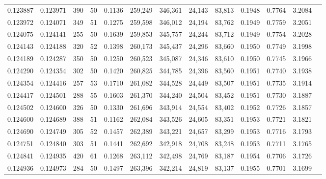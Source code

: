 \begin{tabular}{rrrrrrrrrrrrr}
0.123887 & 0.123971 &   390 &  50 &                                     0.1136 & 259,249 & 346,361 &  24,143 &  83,813 & 0.1948 & 0.7764 & 3.2084 \\
0.123972 & 0.124071 &   349 &  51 &                                     0.1275 & 259,598 & 346,012 &  24,194 &  83,762 & 0.1949 & 0.7759 & 3.2051 \\
0.124075 & 0.124141 &   255 &  50 &                                     0.1639 & 259,853 & 345,757 &  24,244 &  83,712 & 0.1949 & 0.7754 & 3.2028 \\
0.124143 & 0.124188 &   320 &  52 &                                     0.1398 & 260,173 & 345,437 &  24,296 &  83,660 & 0.1950 & 0.7749 & 3.1998 \\
0.124189 & 0.124287 &   350 &  50 &                                     0.1250 & 260,523 & 345,087 &  24,346 &  83,610 & 0.1950 & 0.7745 & 3.1966 \\
0.124290 & 0.124354 &   302 &  50 &                                     0.1420 & 260,825 & 344,785 &  24,396 &  83,560 & 0.1951 & 0.7740 & 3.1938 \\
0.124354 & 0.124416 &   257 &  53 &                                     0.1710 & 261,082 & 344,528 &  24,449 &  83,507 & 0.1951 & 0.7735 & 3.1914 \\
0.124417 & 0.124501 &   288 &  55 &                                     0.1603 & 261,370 & 344,240 &  24,504 &  83,452 & 0.1951 & 0.7730 & 3.1887 \\
0.124502 & 0.124600 &   326 &  50 &                                     0.1330 & 261,696 & 343,914 &  24,554 &  83,402 & 0.1952 & 0.7726 & 3.1857 \\
0.124600 & 0.124689 &   388 &  51 &                                     0.1162 & 262,084 & 343,526 &  24,605 &  83,351 & 0.1953 & 0.7721 & 3.1821 \\
0.124690 & 0.124749 &   305 &  52 &                                     0.1457 & 262,389 & 343,221 &  24,657 &  83,299 & 0.1953 & 0.7716 & 3.1793 \\
0.124751 & 0.124840 &   303 &  51 &                                     0.1441 & 262,692 & 342,918 &  24,708 &  83,248 & 0.1953 & 0.7711 & 3.1765 \\
0.124841 & 0.124935 &   420 &  61 &                                     0.1268 & 263,112 & 342,498 &  24,769 &  83,187 & 0.1954 & 0.7706 & 3.1726 \\
0.124936 & 0.124973 &   284 &  50 &                                     0.1497 & 263,396 & 342,214 &  24,819 &  83,137 & 0.1955 & 0.7701 & 3.1699 \\

\end{tabular}
